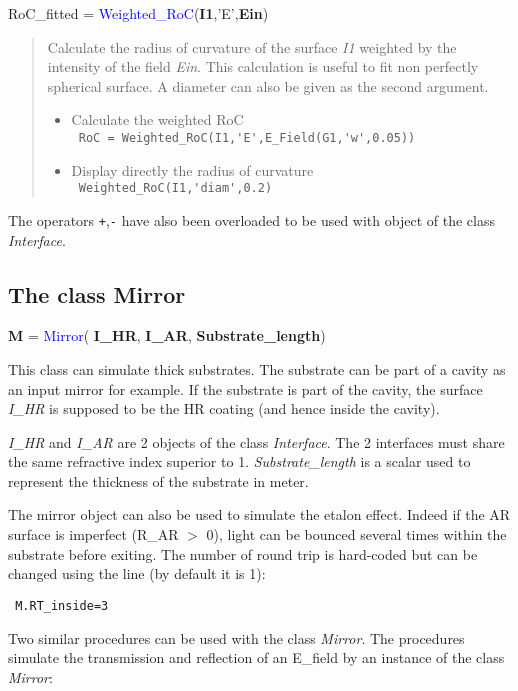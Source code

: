 \noindent RoC\_fitted = \textcolor{blue}{Weighted\_RoC}(\textbf{I1},'E',\textbf{Ein})
\vspace*{-0.2cm}
\begin{quote}
Calculate the radius of curvature of the surface \textsl{I1} weighted by the intensity of the field \textsl{Ein}. This calculation is useful to fit non perfectly spherical surface. A diameter can also be given as the second argument.
\begin{itemize}
  \item Calculate the weighted RoC \\
        \verb? RoC = Weighted_RoC(I1,'E',E_Field(G1,'w',0.05)) ?
  \item Display directly the radius of curvature \\
        \verb? Weighted_RoC(I1,'diam',0.2) ?
\end{itemize}
\end{quote}

The operators \verb?+?,\verb?-? have also been overloaded to be used with object of the class \textit{Interface}.

\subsection{The class Mirror}
\textbf{M} = \textcolor{blue}{Mirror}( \textbf{I\_HR}, \textbf{I\_AR}, \textbf{Substrate\_length})

This class can simulate thick substrates. The substrate can be part of a cavity as an input mirror for example. If the substrate is part of the cavity, the surface \textsl{I\_HR} is supposed to be the HR coating (and hence inside the cavity).

\textsl{I\_HR} and \textsl{I\_AR} are 2 objects of the class \textsl{Interface}. The 2 interfaces must share the same refractive index superior to 1. \textsl{Substrate\_length} is a scalar used to represent the thickness of the substrate in meter.

The mirror object can also be used to simulate the etalon effect. Indeed if the AR surface is imperfect (R\_AR $>$ 0), light can be bounced several times within the substrate before exiting. The number of round trip is hard-coded but can be changed using the line (by default it is 1):

 \verb? M.RT_inside=3 ?

Two similar procedures can be used with the class \textsl{Mirror}. The procedures simulate the transmission and reflection of an E\_field by an instance of the class \textsl{Mirror}:

